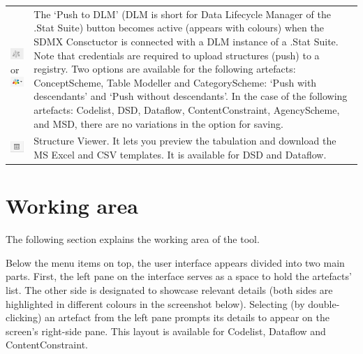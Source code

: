 \documentclass[
]{book}
\begin{document}
\begin{longtable}[]{@{}
  >{\raggedright\arraybackslash}p{}
  >{\raggedright\arraybackslash}p{}@{}}
\includegraphics{images/image037.png} or \includegraphics{images/image038.png} & The `Push to DLM' (DLM is short for Data Lifecycle Manager of the .Stat Suite) button becomes active (appears with colours) when the SDMX Consctuctor is connected with a DLM instance of a .Stat Suite. Note that credentials are required to upload structures (push) to a registry. Two options are available for the following artefacts: ConceptScheme, Table Modeller and CategoryScheme: `Push with descendants' and `Push without descendants'. In the case of the following artefacts: Codelist, DSD, Dataflow, ContentConstraint, AgencyScheme, and MSD, there are no variations in the option for saving. \\
\includegraphics{images/image039.png} & Structure Viewer. It lets you preview the tabulation and download the MS Excel and CSV templates. It is available for DSD and Dataflow. \\
\bottomrule()
\end{longtable}

\hypertarget{working-area}{%
\section{Working area}\label{working-area}}

The following section explains the working area of the tool.

Below the menu items on top, the user interface appears divided into two main parts. First, the left pane on the interface serves as a space to hold the artefacts' list. The other side is designated to showcase relevant details (both sides are highlighted in different colours in the screenshot below). Selecting (by double-clicking) an artefact from the left pane prompts its details to appear on the screen's right-side pane. This layout is available for Codelist, Dataflow and ContentConstraint.
\end{document}
